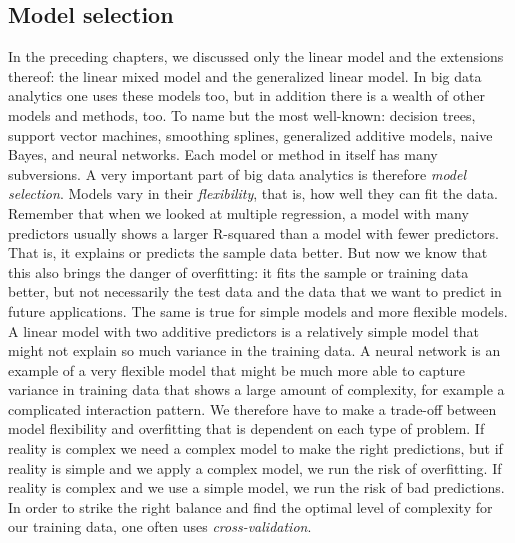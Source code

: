 \documentclass[]{book}\usepackage[]{graphicx}\usepackage[]{color}
\begin{document}
\subsection{Model selection}
In the preceding chapters, we discussed only the linear model and the extensions thereof: the linear mixed model and the generalized linear model. In big data analytics one uses these models too, but in addition there is a wealth of other models and methods, too. To name but the most well-known: decision trees, support vector machines, smoothing splines, generalized additive models, naive Bayes, and neural networks. Each model or method in itself has many subversions. A very important part of big data analytics is therefore \textit{model selection}. Models vary in their \textit{flexibility}, that is, how well they can fit the data. Remember that when we looked at multiple regression, a model with many predictors usually shows a larger R-squared than a model with fewer predictors. That is, it explains or predicts the sample data better. But now we know that this also brings the danger of overfitting: it fits the sample or training data better, but not necessarily the test data and the data that we want to predict in future applications. The same is true for simple models and more flexible models. A linear model with two additive predictors is a relatively simple model that might not explain so much variance in the training data. A neural network is an example of a very flexible model that might be much more able to capture variance in training data that shows a large amount of complexity, for example a complicated interaction pattern. We therefore have to make a trade-off between model flexibility and overfitting that is dependent on each type of problem. If reality is complex we need a complex model to make the right predictions, but if reality is simple and we apply a complex model, we run the risk of overfitting. If reality is complex and we use a simple model, we run the risk of bad predictions. In order to strike the right balance and find the optimal level of complexity for our training data, one often uses \textit{cross-validation}. 
\end{document}
